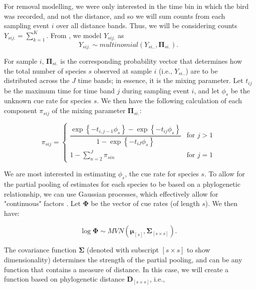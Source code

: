 \documentclass[12pt]{article}
\begin{document}
\par For removal modelling, we were only interested in the time bin in which the bird was recorded, and not the distance, and so we will sum counts from each sampling event $i$ over all distance bands. 
Thus, we will be considering counts $Y_{sij.} = \sum_{k=1}^{K}$. 
From \citet{solymos_calibrating_2013}, we model $Y_{sij.}$ as
$$Y_{sij.} \sim multinomial\left(Y_{si..}, \mathbf{\Pi}_{si.}\right).$$

\par For sample $i$, $\mathbf{\Pi}_{si.}$ is the corresponding probability vector that determines how the total number of species $s$ observed at sample $i$ (i.e., $Y_{si..}$) are to be distributed across the $J$ time bands; in essence, it is the mixing parameter.
Let $t_{ij}$ be the maximum time for time band $j$ during sampling event $i$, and let $\phi_s$ be the unknown cue rate for species $s$.
We then have the following calculation of each component $\pi_{sij}$ of the mixing parameter $\mathbf{\Pi}_{si.}$:

\begin{equation*}
	\pi_{sij} = 
	\begin{cases}
		\dfrac{\exp\left\{ -t_{i,j-1}\phi_{s} \right\} - \exp\left\{ -t_{ij}\phi_{s} \right\}}{1 - \exp\left\{ -t_{iJ}\phi_{s} \right\}} & \text{for } j > 1 \\
		1 - \sum_{n = 2}^{J} \pi_{sin} & \text{for } j = 1
	\end{cases}
\end{equation*}

\par We are most interested in estimating $\phi_s$, the cue rate for species $s$. 
To allow for the partial pooling of estimates for each species to be based on a phylogenetic relationship, we can use Gaussian processes, which effectively allow for "continuous" factors \citep{bernardo_regression_1998, mcelreath_continous_2020}. 
Let $\mathbf{\Phi}$ be the vector of cue rates (of length $s$). 
We then have:

$$\log \mathbf{\Phi} \sim MVN\left( \mathbf{\mu}_{[s]}, \mathbf{\Sigma}_{[s \times s]} \right).$$

\par The covariance function $\mathbf{\Sigma}$ (denoted with subscript $[s \times s]$ to show dimensionality) determines the strength of the partial pooling, and can be any function that contains a measure of distance. 
In this case, we will create a function based on phylogenetic distance $\mathbf{D}_{[s \times s]}$, i.e.,
\end{document}
